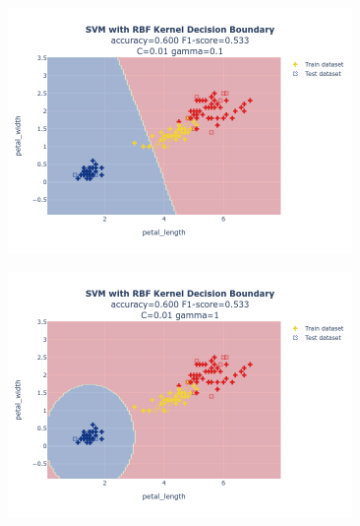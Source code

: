\documentclass{article}
\begin{document}
\begin{figure}
    \begin{subfigure}{0.3\textwidth}
        \centering
        \includegraphics[scale=.13]{images/implementation/q1/rbf_kernel/petal_length_petal_width_0.01_0.1.png}
    \end{subfigure}
    \hfill
    \begin{subfigure}{0.3\textwidth}
        \centering
        \includegraphics[scale=.13]{images/implementation/q1/rbf_kernel/petal_length_petal_width_0.01_1.png}
    \end{subfigure}
    \hfill
    \begin{subfigure}{0.3\textwidth}
        \centering

\end{subfigure}
\end{figure}
\end{document}
